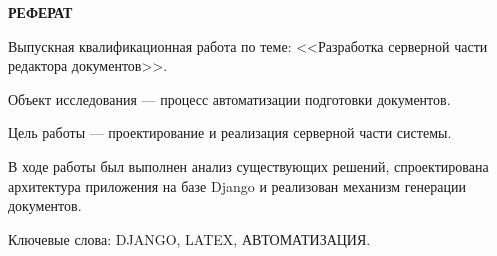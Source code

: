 \begin{center}
	\textbf{РЕФЕРАТ}\\[3mm]
\end{center}

Выпускная квалификационная работа по теме: <<Разработка серверной части редактора документов>>.

Объект исследования --- процесс автоматизации подготовки документов.

Цель работы --- проектирование и реализация серверной части системы.


В ходе работы был выполнен анализ существующих решений, спроектирована архитектура приложения на базе Django и реализован механизм генерации документов.


\vspace{5mm}
\noindent Ключевые слова: DJANGO, LATEX, АВТОМАТИЗАЦИЯ.